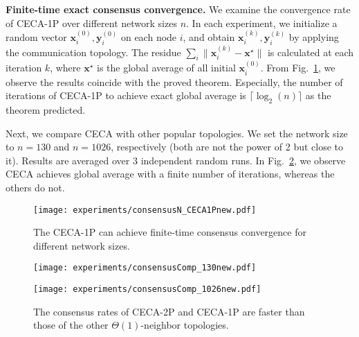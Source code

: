 \documentclass{article}
\newcommand{\bvx}{\boldsymbol{x}}
\newcommand{\bvy}{\boldsymbol{y}}
\newcommand{\ko}{{(k)}}
\theoremstyle{plain}
\theoremstyle{definition}
\begin{document}
\textbf{Finite-time exact consensus convergence.}
We examine the convergence rate of CECA-1P over different network sizes $n$. In each experiment, we initialize a random vector {$\bvx_i^{(0)},\bvy_i^{(0)}$} on each node $i$, and obtain  {$\bvx_i^\ko,\bvy_i^\ko$} by applying the communication topology. The residue $\sum_i\|\bvx_i^\ko-\bvx^\star\|$ is calculated at each iteration $k$, where $\bvx^\star$ is the global average of all initial $\bvx_i^{(0)}$. From Fig.~\ref{fig:consensusN}, we observe the results coincide with the proved theorem. Especially, the number of iterations of CECA-1P to achieve exact global average is $\lceil \log_2(n) \rceil$ as the theorem predicted.

Next, we compare CECA with other popular topologies. We set the network size to $n=130$ and $n=1026$, respectively (both are not the power of 2 but close to it). Results are averaged over $3$ independent random runs. In Fig.~\ref{fig:consensusComp}, we observe CECA achieves global average with a finite number of iterations, whereas the others do not.


\begin{figure}[ht]
\vskip -0.05in
\begin{center}
\centerline{\texttt{[image: experiments/consensusN\_CECA1Pnew.pdf]}}
\vskip -0.15in
\caption{The CECA-1P can achieve finite-time consensus convergence for different network sizes.}
\label{fig:consensusN}
\end{center}
\vskip -0.15in
\end{figure}

\begin{figure}[ht]
\vskip 0.05in
\begin{center}
\centerline{\texttt{[image: experiments/consensusComp\_130new.pdf]}}
\centerline{\texttt{[image: experiments/consensusComp\_1026new.pdf]}}
\vskip -0.15in
\caption{The consensus rates of CECA-2P and CECA-1P are faster than those of the other $\Theta(1)$-neighbor topologies.}
\label{fig:consensusComp}
\end{center}
\vskip -0.3in
\end{figure}
\end{document}

